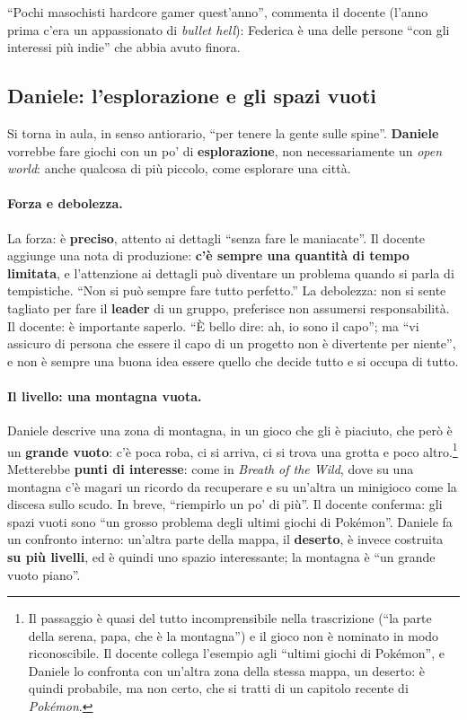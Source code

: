 ``Pochi masochisti hardcore gamer quest'anno'', commenta il docente
(l'anno prima c'era un appassionato di \emph{bullet hell}): Federica è una
delle persone ``con gli interessi più indie'' che abbia avuto finora.

\subsection{Daniele: l'esplorazione e gli spazi vuoti}

Si torna in aula, in senso antiorario, ``per tenere la gente sulle spine''.
\textbf{Daniele} vorrebbe fare giochi con un po' di
\textbf{esplorazione}, non necessariamente un \emph{open world}: anche
qualcosa di più piccolo, come esplorare una città.

\paragraph{Forza e debolezza.} La forza: è \textbf{preciso}, attento ai
dettagli ``senza fare le maniacate''. Il docente aggiunge una nota di
produzione: \textbf{c'è sempre una quantità di tempo limitata}, e l'attenzione
ai dettagli può diventare un problema quando si parla di tempistiche. ``Non si
può sempre fare tutto perfetto.'' La debolezza: non si sente tagliato per fare
il \textbf{leader} di un gruppo, preferisce non assumersi responsabilità. Il
docente: è importante saperlo. ``È bello dire: ah, io sono il capo''; ma
``vi assicuro di persona che essere il capo di un progetto non è divertente
per niente'', e non è sempre una buona idea essere quello che decide tutto e si
occupa di tutto.

\paragraph{Il livello: una montagna vuota.} Daniele descrive una zona di
montagna, in un gioco che gli è piaciuto, che però è un \textbf{grande vuoto}:
c'è poca roba, ci si arriva, ci si trova una grotta e poco
altro.\footnote{Il passaggio è quasi del tutto incomprensibile nella
trascrizione (``la parte della serena, papa, che è la montagna'') e il gioco
non è nominato in modo riconoscibile. Il docente collega l'esempio agli
``ultimi giochi di Pokémon'', e Daniele lo confronta con un'altra zona della
stessa mappa, un deserto: è quindi probabile, ma non certo, che si tratti di un
capitolo recente di \emph{Pokémon}.} Metterebbe \textbf{punti di interesse}:
come in \emph{Breath of the Wild}, dove su una montagna c'è magari un ricordo da
recuperare e su un'altra un minigioco come la discesa sullo scudo. In breve,
``riempirlo un po' di più''. Il docente conferma: gli spazi vuoti sono ``un
grosso problema degli ultimi giochi di Pokémon''. Daniele fa un confronto
interno: un'altra parte della mappa, il \textbf{deserto}, è invece costruita
\textbf{su più livelli}, ed è quindi uno spazio interessante; la montagna è
``un grande vuoto piano''.

